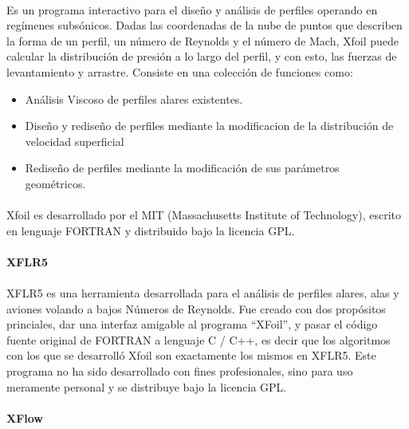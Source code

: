 \documentclass[letterpaper, openright, 12pt]{book}
\begin{document}
    \paragraph*{}
    Es un programa interactivo para el diseño y análisis de perfiles operando
    en regímenes subsónicos. Dadas las coordenadas de la nube de puntos que
    describen la forma de un perfil, un número de Reynolds y el número de Mach,
    Xfoil puede calcular la distribución de presión a lo largo del perfil, y
    con esto, las fuerzas de levantamiento y arrastre. Consiste en una
    colección de funciones como:
    \begin{itemize}
        \item Análisis Viscoso de perfiles alares existentes.
        \item Diseño y rediseño de perfiles mediante la
            modificacion de la distribución de velocidad
            superficial
        \item Rediseño de perfiles mediante la modificación de
            sus parámetros geométricos.~\cite{xfoil}
    \end{itemize}

    \paragraph*{}
    Xfoil es desarrollado por el MIT (Massachusetts Institute of
    Technology), escrito en lenguaje FORTRAN y distribuido bajo
    la licencia GPL\@.

    \paragraph*{XFLR5}
    \paragraph*{}
    XFLR5 es una herramienta desarrollada para el análisis de perfiles alares,
    alas y aviones volando a bajos Números de Reynolds. Fue creado con dos
    propósitos princiales, dar una interfaz amigable al programa ``XFoil'', y
    pasar el código fuente original de FORTRAN a lenguaje C / C++, es decir que
    los algoritmos con los que se desarrolló Xfoil son exactamente los mismos
    en XFLR5.\cite{xflr5} Este programa no ha sido desarrollado con fines
    profesionales, sino para uso meramente personal y se distribuye bajo la
    licencia GPL\@.

    \paragraph*{XFlow}
\end{document}
